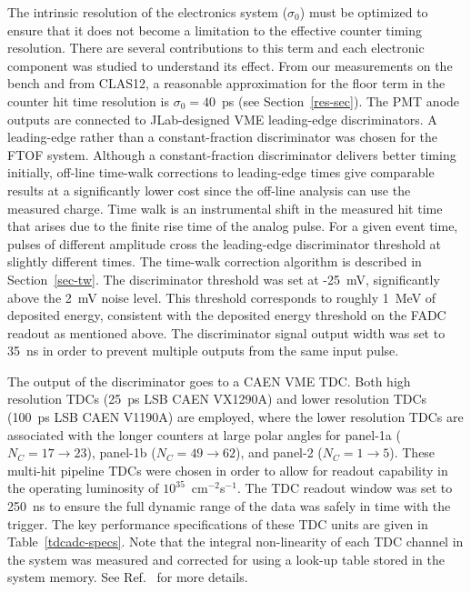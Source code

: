 \documentclass[3p,times,twocolumn]{elsarticle}
\begin{document}
The intrinsic resolution of the electronics system ($\sigma_0$) must be optimized to ensure that it does
not become a limitation to the effective counter timing resolution. There are several contributions to this
term and each electronic component was studied to understand its effect.  From our measurements on the
bench and from CLAS12, a reasonable approximation for the floor term in the counter hit time resolution
is $\sigma_0=40$~ps (see Section~\ref{res-sec}). The PMT anode outputs are connected to JLab-designed
VME leading-edge discriminators. A leading-edge rather than a constant-fraction discriminator was chosen
for the FTOF system. Although a constant-fraction discriminator delivers better timing initially, off-line
time-walk corrections to leading-edge times give comparable results at a significantly lower cost since the
off-line analysis can use the measured charge. Time walk is an instrumental shift in the measured hit time
that arises due to the finite rise time of the analog pulse. For a given event time, pulses of different
amplitude cross the leading-edge discriminator threshold at slightly different times. The time-walk correction
algorithm is described in Section~\ref{sec-tw}. The discriminator threshold was set at -25~mV, significantly
above the 2~mV noise level. This threshold corresponds to roughly 1~MeV of deposited energy, consistent
with the deposited energy threshold on the FADC readout as mentioned above. The discriminator signal output
width was set to 35~ns in order to prevent multiple outputs from the same input pulse.

The output of the discriminator goes to a CAEN VME TDC. Both high resolution TDCs (25~ps LSB CAEN
VX1290A) and lower resolution TDCs (100~ps LSB CAEN V1190A) are employed, where the lower resolution
TDCs are associated with the longer counters at large polar angles for panel-1a ($N_C = 17 \to 23$), panel-1b
($N_C = 49 \to 62$), and panel-2 ($N_C = 1 \to 5$). These multi-hit pipeline TDCs were chosen in order to
allow for readout capability in the operating luminosity of $10^{35}$~cm$^{-2}$s$^{-1}$. The TDC readout window
was set to 250~ns to ensure the full dynamic range of the data was safely in time with the trigger. The key
performance specifications of these TDC units are given in Table~\ref{tdcadc-specs}. Note that the integral
non-linearity of each TDC channel in the system was measured and corrected for using a look-up table stored in
the system memory. See Ref.~\cite{daq-nim} for more details.
\end{document}
